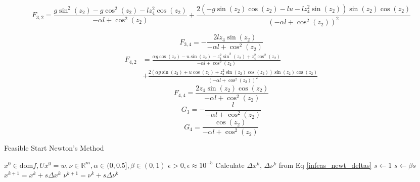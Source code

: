 \documentclass{exam}
\begin{document}
\begin{equation}
    \label{eq:f-start}
    F_{3,2} = \frac{g \sin^{2}{\left(z_{2} \right)} - g \cos^{2}{\left(z_{2} \right)} - l z_{4}^{2} \cos{\left(z_{2} \right)}}{- \alpha l + \cos^{2}{\left(z_{2} \right)}} + \frac{2 \left(- g \sin{\left(z_{2} \right)} \cos{\left(z_{2} \right)} - l u - l z_{4}^{2} \sin{\left(z_{2} \right)}\right) \sin{\left(z_{2} \right)} \cos{\left(z_{2} \right)}}{\left(- \alpha l + \cos^{2}{\left(z_{2} \right)}\right)^{2}}
\end{equation}

\begin{equation}
    F_{3,4} = - \frac{2 l z_{4} \sin{\left(z_{2} \right)}}{- \alpha l + \cos^{2}{\left(z_{2} \right)}}
\end{equation}
%
\begin{equation}
    \begin{aligned}
        F_{4,2} &= \frac{\alpha g \cos{\left(z_{2} \right)} - u \sin{\left(z_{2} \right)} - z_{4}^{2} \sin^{2}{\left(z_{2} \right)} + z_{4}^{2} \cos^{2}{\left(z_{2} \right)}}{- \alpha l + \cos^{2}{\left(z_{2} \right)}} \\
        &+ \frac{2 \left(\alpha g \sin{\left(z_{2} \right)} + u \cos{\left(z_{2} \right)} + z_{4}^{2} \sin{\left(z_{2} \right)} \cos{\left(z_{2} \right)}\right) \sin{\left(z_{2} \right)} \cos{\left(z_{2} \right)}}{\left(- \alpha l + \cos^{2}{\left(z_{2} \right)}\right)^{2}}
    \end{aligned}
\end{equation}
%
\begin{equation}
    F_{4,4} = \frac{2 z_{4} \sin{\left(z_{2} \right)} \cos{\left(z_{2} \right)}}{- \alpha l + \cos^{2}{\left(z_{2} \right)}}
\end{equation}
%
\begin{equation}
    G_3 = - \frac{l}{- \alpha l + \cos^{2}{\left(z_{2} \right)}}
\end{equation}
%
\begin{equation}
    \label{eq:g-end}
    G_4 = \frac{\cos{\left(z_{2} \right)}}{- \alpha l + \cos^{2}{\left(z_{2} \right)}}
\end{equation}

\begin{algorithm}
    \caption{Feasible Start Newton's Method}
    \label{feas-start-newtons-algo}
    \begin{algorithmic}
        \Require $x^0 \in \textrm{dom} f, Ux^0 = w, \nu \in \mathbb{R}^m, \alpha \in (0, 0.5], \beta \in (0, 1)$
        \Require $\epsilon >0, \epsilon \approx 10^{-5}$ 
         
            \State Calculate $\Delta x^k$, $\Delta \nu^k$ from Eq \eqref{infeas_newt_deltas}
            \State $s \gets 1$
                \State $s \gets \beta s$
            \EndWhile
            \State $x^{k+1} = x^k + s \Delta x^k$
            \State $\nu^{k+1} = \nu^k + s \Delta \nu^k$
        \EndWhile
    \end{algorithmic}
\end{algorithm}
\end{document}

